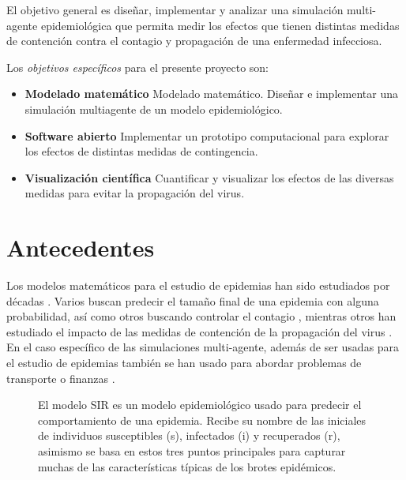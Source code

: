 \documentclass[a4]{sciposter}
\begin{document}
\begin{multicols}{2}
El objetivo general es diseñar, implementar y analizar una simulación multi-agente epidemiológica que permita medir los efectos que tienen distintas medidas de contención contra el contagio y propagación de una enfermedad infecciosa.\par
Los \emph{objetivos específicos} para el presente proyecto son:\par
\begin{itemize}
  \item \textbf{Modelado matemático} Modelado matemático. Diseñar e implementar una simulación multiagente de un modelo epidemiológico.
  \item \textbf{Software abierto} Implementar un prototipo computacional para explorar los efectos de distintas medidas de contingencia.
  \item \textbf{Visualización científica} Cuantificar y visualizar los efectos de las diversas medidas para evitar la propagación del virus.
\end{itemize}

\section{Antecedentes}
Los modelos matemáticos para el estudio de epidemias han sido estudiados por décadas \cite{decadas}. Varios buscan predecir el tamaño final de una epidemia con alguna probabilidad, así como otros buscando controlar el contagio \cite{contagio}, mientras otros han estudiado el impacto de las medidas de contención de la propagación del virus \cite{virus}. En el caso específico de las simulaciones multi-agente, además de ser usadas para el estudio de epidemias \cite{epidemias} también se han usado para abordar problemas de transporte \cite{transporte} o finanzas \cite{finanzas}. 

\begin{figure}
\captionsetup{type=figure}
\setcounter{figure}{0}
\begin{center}
\end{center}
\caption{El modelo SIR es un modelo epidemiológico usado para predecir el comportamiento de una epidemia. Recibe su nombre de las iniciales de individuos susceptibles (s), infectados (i) y recuperados (r), asimismo se basa en estos tres puntos principales para capturar muchas de las características típicas de los brotes epidémicos.}
\label{diag}
\end{figure}


\end{multicols}
\end{document}
